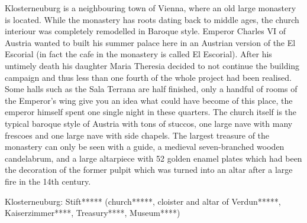 Klosterneuburg is a neighbouring town of Vienna, where an old large monastery is located. While the monastery has roots dating back to middle ages, the church interiour was completely remodelled in Baroque style. Emperor Charles VI of Austria wanted to built his summer palace here in an Austrian version of the El Escorial (in fact the cafe in the monastery is called El Escorial). After his untimely death his daughter Maria Theresia decided to not continue the building campaign and thus less than one fourth of the whole project had been realised. Some halls such as the Sala Terrana are half finished, only a handful of rooms of the Emperor's wing give you an idea what could have become of this place, the emperor himself spent one single night in these quarters. The church itself is the typical baroque style of Austria with tons of stuccos, one large nave with many frescoes and one large nave with side chapels. The largest treasure of the monastery can only be seen with a guide, a medieval seven-branched wooden candelabrum, and a large altarpiece with 52 golden enamel plates which had been the decoration of the former pulpit which was turned into an altar after a large fire in the 14th century.

Klosterneuburg: Stift***** (church*****, cloister and altar of Verdun*****, Kaiserzimmer****, Treasury****, Museum****)





